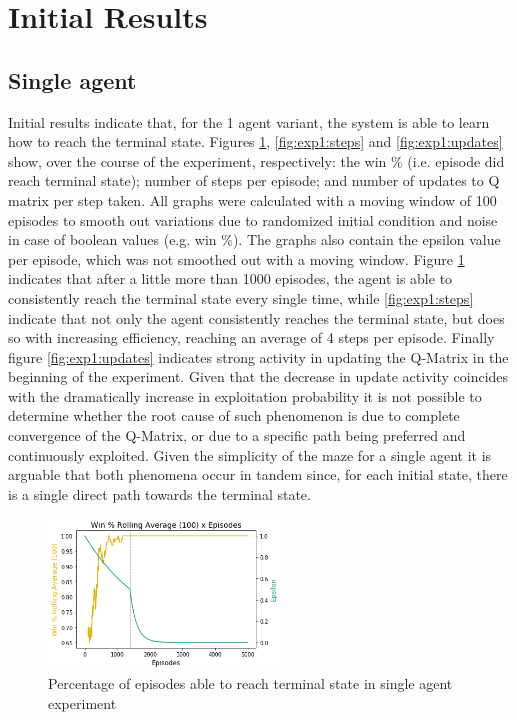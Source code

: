 \documentclass[11pt]{article}
\begin{document}
\section{Initial Results}
\subsection{Single agent}
Initial results indicate that, for the 1 agent variant, the system is able to learn how to reach the terminal state. Figures \ref{fig:exp1:win_percent}, \ref{fig:exp1:steps} and \ref{fig:exp1:updates} show, over the course of the experiment, respectively: the win \% (i.e. episode did reach terminal state); number of steps per episode; and number of updates to Q matrix per step taken. All graphs were calculated with a moving window of 100 episodes to smooth out variations due to randomized initial condition and noise in case of boolean values (e.g. win \%). The graphs also contain the epsilon value per episode, which was not smoothed out with a moving window. Figure \ref{fig:exp1:win_percent} indicates that after a little more than 1000 episodes, the agent is able to consistently reach the terminal state every single time, while \ref{fig:exp1:steps} indicate that not only the agent consistently reaches the terminal state, but does so with increasing efficiency, reaching an average of 4 steps per episode. Finally figure \ref{fig:exp1:updates} indicates strong activity in updating the Q-Matrix in the beginning of the experiment. Given that the decrease in update activity coincides with the dramatically increase in exploitation probability it is not possible to determine whether the root cause of such phenomenon is due to complete convergence of the Q-Matrix, or due to a specific path being preferred and continuously exploited. Given the simplicity of the maze for a single agent it is arguable that both phenomena occur in tandem since, for each initial state, there is a single direct path towards the terminal state.
\begin{figure}[h]
    \includegraphics[height=4cm]{Images/exp_1/1_win_percent.png}
    \caption{Percentage of episodes able to reach terminal state in single agent experiment}
    \label{fig:exp1:win_percent}
\end{figure}
\end{document}

